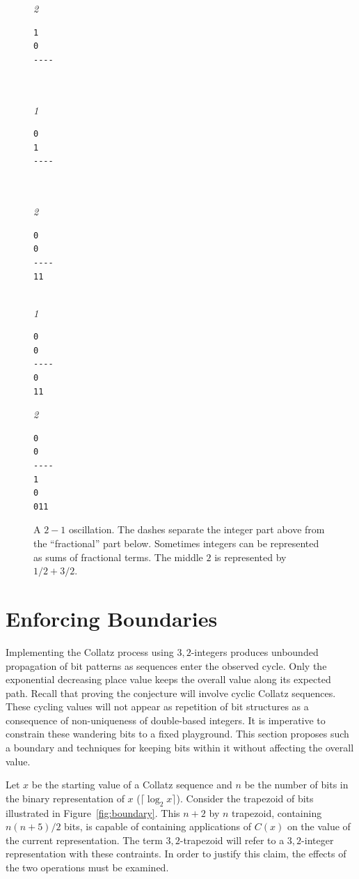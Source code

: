 \documentclass{article}
\begin{document}
\begin{figure}
  \begin{multicols}{5}
\emph{2}
\begin{verbatim}
1
0
----



\end{verbatim}
\columnbreak
\emph{1}
\begin{verbatim}
0
1
----



\end{verbatim}
\columnbreak
\emph{2}
\begin{verbatim}
0
0
----
11


\end{verbatim}
\columnbreak
\emph{1}
\begin{verbatim}
0
0
----
0
11

\end{verbatim}
\columnbreak
\emph{2}
\begin{verbatim}
0
0
----
1
0
011
\end{verbatim}
\columnbreak
  \end{multicols}
  \caption{A $2-1$ oscillation. The dashes separate the integer part above
    from the ``fractional'' part below. Sometimes integers can be represented
    as sums of fractional terms. The middle $2$ is represented by $1/2 + 3/2$.}
  \label{fig:21}
\end{figure}

\section{Enforcing Boundaries}

Implementing the Collatz process using ${3,2}$-integers produces
unbounded propagation of bit patterns as sequences enter the observed cycle.
Only the exponential decreasing place value keeps the overall value
along its expected path. Recall that proving the conjecture will involve
cyclic Collatz sequences. These cycling values will not appear as repetition
of bit structures as a consequence of non-uniqueness of double-based integers.
It is imperative to constrain these wandering bits to a fixed playground. This
section proposes such a boundary and techniques for keeping bits within it without
affecting the overall value.

Let $x$ be the starting value of a Collatz sequence and $n$ be the number of
bits in the binary representation of $x$ ($\lceil\log_2x\rceil$). Consider the
trapezoid of bits illustrated in Figure~\ref{fig:boundary}. This $n+2$ by $n$
trapezoid, containing $n(n+5)/2$ bits, is capable of containing applications of
$C(x)$ on the value of the current representation.  The term
${3,2}$-trapezoid will refer to a ${3,2}$-integer representation with these contraints.
In order to justify this claim, the effects of the two operations must be examined.
\end{document}
